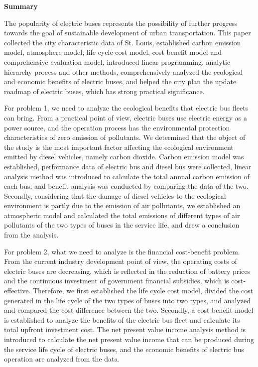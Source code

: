 \documentclass[12pt]{article}
\begin{document}
\thispagestyle{empty}

\medskip
\begin{center}
\large\bfseries Summary
\end{center}
The popularity of electric buses represents the possibility of further progress towards the goal of sustainable development of 
urban transportation. This paper collected the city characteristic data of St. Louis, established carbon emission model, atmosphere 
model, life cycle cost model, cost-benefit model and comprehensive evaluation model, introduced linear programming, analytic hierarchy 
process and other methods, comprehensively analyzed the ecological and economic benefits of electric buses, and helped the city plan 
the update roadmap of electric buses, which has strong practical significance.

For problem 1, we need to analyze the ecological benefits that electric bus fleets can bring. From a practical point of 
view, electric buses use electric energy as a power source, and the operation process has the environmental protection characteristics 
of zero emission of pollutants. We determined that the object of the study is the most important factor affecting the ecological 
environment emitted by diesel vehicles, namely carbon dioxide. Carbon emission model was established, performance data of electric 
bus and diesel bus were collected, linear analysis method was introduced to calculate the total annual carbon emission of each bus, 
and benefit analysis was conducted by comparing the data of the two. Secondly, considering that the damage of diesel vehicles to the 
ecological environment is partly due to the emission of air pollutants, we established an atmospheric model and calculated the total 
emissions of different types of air pollutants of the two types of buses in the service life, and drew a conclusion from the analysis.

For problem 2, what we need to analyze is the financial cost-benefit problem. From the current industry development point of view, 
the operating costs of electric buses are decreasing, which is reflected in the reduction of battery prices and the continuous 
investment of government financial subsidies, which is cost-effective. Therefore, we first established the life cycle cost model, 
divided the cost generated in the life cycle of the two types of buses into two types, and analyzed and compared the cost difference 
between the two. Secondly, a cost-benefit model is established to analyze the benefits of the electric bus fleet and calculate its 
total upfront investment cost. The net present value income analysis method is introduced to calculate the net present value income 
that can be produced during the service life cycle of electric buses, and the economic benefits of electric bus operation are analyzed 
from the data.
\end{document}
